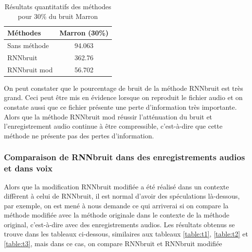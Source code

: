 \documentclass[conference,onecolumn]{IEEEtran}
\begin{document}
\begin{table}[H]
    \centering
    \begin{tabular}{ l  c }
    \textbf{Méthodes} & \textbf{Marron (30\%)} \\
    \hline
    Sans méthode &  94.063\\
    RNNbruit &  362.76\\
    RNNbruit mod &  56.702\\
    \end{tabular}
    \caption{Résultats quantitatifs des méthodes pour 30\% du bruit Marron}
    \label{table:t24}
\end{table}

On peut constater que le pourcentage de bruit de la méthode RNNbruit est très grand. Ceci peut être mis en  évidence lorsque on reproduit le fichier audio et on constate aussi que ce fichier présente une perte d’information très importante. Alors que la méthode RNNbruit mod réussir l’atténuation du bruit et l’enregistrement audio continue à être compressible, c’est-à-dire que cette méthode ne présente pas des pertes d’information.

\subsubsection{Comparaison de RNNbruit dans des enregistrements audios et dans voix}

Alors que la modification RNNbruit modifiée a été réalisé dans un contexte diffèrent à celui de RNNbruit, il est normal d’avoir des spéculations là-dessous, par exemple, on est mené à nous demande ce qui arriverai si on compare la méthode modifiée avec la méthode originale dans le contexte de la méthode original, c’est-à-dire avec des enregistrements audios. Les résultats obtenus se trouve dans les tableaux ci-dessous, similaires aux tableaux \ref{table:t1}, \ref{table:t2} et \ref{table:t3}, mais dans ce cas, on compare RNNbruit et RNNbruit modifiée
\end{document}
